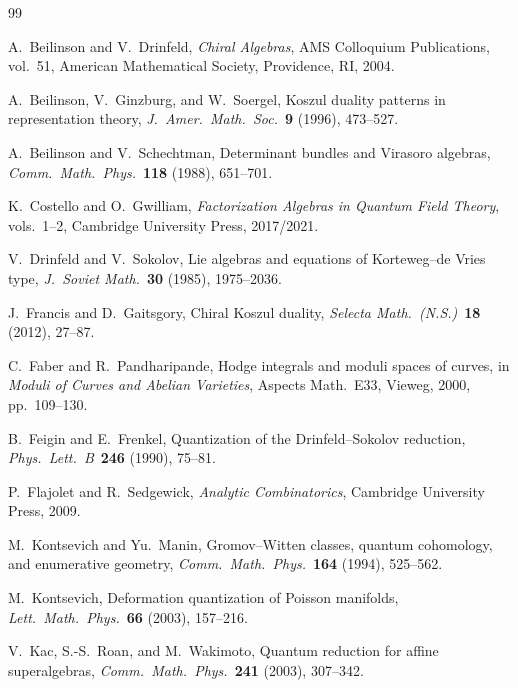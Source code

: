 \documentclass[11pt,reqno]{amsart}
\theoremstyle{definition}
\theoremstyle{remark}
\numberwithin{equation}{section}
\begin{document}

\begin{thebibliography}{99}

A.~Beilinson and V.~Drinfeld,
\textit{Chiral Algebras},
AMS Colloquium Publications, vol.~51,
American Mathematical Society, Providence, RI, 2004.

A.~Beilinson, V.~Ginzburg, and W.~Soergel,
Koszul duality patterns in representation theory,
\textit{J.~Amer.\ Math.\ Soc.}~\textbf{9} (1996), 473--527.

A.~Beilinson and V.~Schechtman,
Determinant bundles and Virasoro algebras,
\textit{Comm.\ Math.\ Phys.}~\textbf{118} (1988), 651--701.

K.~Costello and O.~Gwilliam,
\textit{Factorization Algebras in Quantum Field Theory},
vols.~1--2, Cambridge University Press, 2017/2021.

V.~Drinfeld and V.~Sokolov,
Lie algebras and equations of Korteweg--de Vries type,
\textit{J.~Soviet Math.}~\textbf{30} (1985), 1975--2036.

J.~Francis and D.~Gaitsgory,
Chiral Koszul duality,
\textit{Selecta Math.\ (N.S.)}~\textbf{18} (2012), 27--87.

C.~Faber and R.~Pandharipande,
Hodge integrals and moduli spaces of curves,
in \textit{Moduli of Curves and Abelian Varieties},
Aspects Math.~E33, Vieweg, 2000, pp.~109--130.

B.~Feigin and E.~Frenkel,
Quantization of the Drinfeld--Sokolov reduction,
\textit{Phys.\ Lett.\ B}~\textbf{246} (1990), 75--81.

P.~Flajolet and R.~Sedgewick,
\textit{Analytic Combinatorics},
Cambridge University Press, 2009.

M.~Kontsevich and Yu.~Manin,
Gromov--Witten classes, quantum cohomology, and enumerative geometry,
\textit{Comm.\ Math.\ Phys.}~\textbf{164} (1994), 525--562.

M.~Kontsevich,
Deformation quantization of Poisson manifolds,
\textit{Lett.\ Math.\ Phys.}~\textbf{66} (2003), 157--216.

V.~Kac, S.-S.~Roan, and M.~Wakimoto,
Quantum reduction for affine superalgebras,
\textit{Comm.\ Math.\ Phys.}~\textbf{241} (2003), 307--342.


\end{thebibliography}
\end{document}
